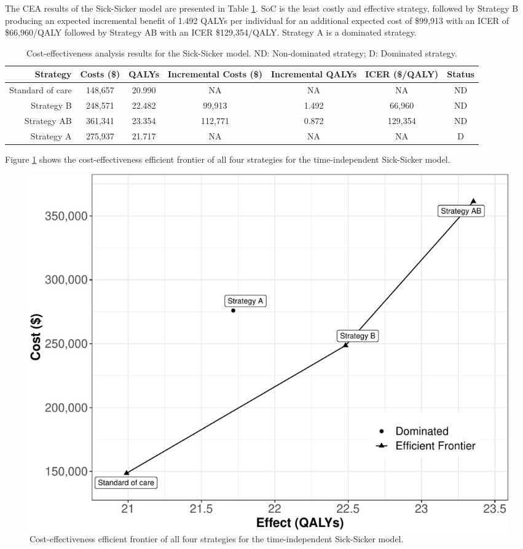 \documentclass[
]{article}
\begin{document}
The CEA results of the Sick-Sicker model are presented in Table \ref{tab:table-cea}. SoC is the least costly and effective strategy, followed by Strategy B producing an expected incremental benefit of 1.492 QALYs per individual for an additional expected cost of \$99,913 with an ICER of \$66,960/QALY followed by Strategy AB with an ICER \$129,354/QALY. Strategy A is a dominated strategy.

\begin{table}[!h]

\caption{\label{tab:table-cea}Cost-effectiveness analysis results for the Sick-Sicker model. ND: Non-dominated strategy; D: Dominated strategy.}
\centering
\begin{tabular}[t]{rcccccc}
\toprule
Strategy & Costs (\$) & QALYs & Incremental Costs (\$) & Incremental QALYs & ICER (\$/QALY) & Status\\
\midrule
Standard of care & 148,657 & 20.990 & NA & NA & NA & ND\\
Strategy B & 248,571 & 22.482 & 99,913 & 1.492 & 66,960 & ND\\
Strategy AB & 361,341 & 23.354 & 112,771 & 0.872 & 129,354 & ND\\
Strategy A & 275,937 & 21.717 & NA & NA & NA & D\\
\bottomrule
\end{tabular}
\end{table}

Figure \ref{fig:Sick-Sicker-CEA} shows the cost-effectiveness efficient frontier of all four strategies for the time-independent Sick-Sicker model.

\begin{figure}[H]

{\centering \includegraphics{figs/Sick-Sicker-CEA-1} 

}

\caption{Cost-effectiveness efficient frontier of all four strategies for the time-independent Sick-Sicker model.}\label{fig:Sick-Sicker-CEA}
\end{figure}
\end{document}
